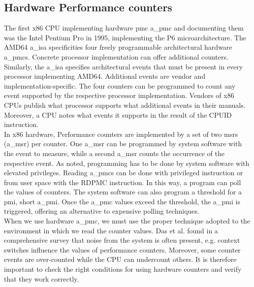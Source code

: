 \subsection{Hardware Performance counters}
\label{sec:state:technical:hpc}
The first x86 CPU implementing hardware \gls{pmc} \acrshort{a_pmc} and
documenting them was the Intel Pentium Pro in 1995, implementing the P6
microarchitecture.\cite{intel_sdm} The AMD64 \acrshort{a_isa} specificities four
freely programmable architectural hardware \acrshort{a_pmc}s.\cite{amd_manual}
Concrete processor implementation can offer additional counters. Similarly, the
\acrshort{a_isa} specifies architectural events that must be present in every
processor implementing AMD64. Additional events are vendor and
implementation-specific. The four counters can be programmed to count any event
supported by the respective processor implementation. Vendors of x86 CPUs
publish what processor supports what additional events in their manuals.
Moreover, a CPU notes what events it supports in the result of the \gls{CPUID}
instruction. \\

In x86 hardware, Performance counters are implemented by a set of two \gls{msr}s
(\acrshort{a_msr}) per counter. One \acrshort{a_msr} can be programmed by system
software with the event to measure, while a second \acrshort{a_msr} counts the
occurrence of the respective event. As noted, programming has to be done by
system software with elevated privileges. Reading \acrlong{a_pmc}s can be done
with privileged instruction or from user space with the RDPMC instruction. In
this way, a program can poll the values of counters. The system software can
also program a threshold for a \gls{pmi}, short \acrshort{a_pmi}. Once the
\acrshort{a_pmc} values exceed the threshold, the \acrshort{a_pmi} is triggered,
offering an alternative to expensive polling techniques.\\

When we use hardware \acrshort{a_pmc}, we must use the proper technique adopted
to the environment in which we read the counter values. Das et al. found in a
comprehensive survey that noise from the system is often present, e.g. context
switches influence the values of performance counters. \cite{das_sok_2019}
Moreover, some counter events are over-counted while the CPU can undercount
others.\cite{weaver_non-determinism_2013} It is therefore important to check the
right conditions for using hardware counters and verify that they work
correctly.

